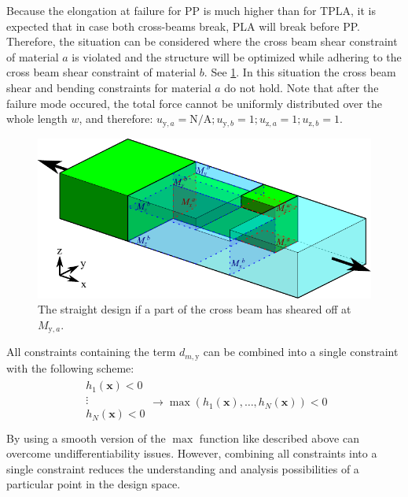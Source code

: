 Because the elongation at failure for PP is much higher than for TPLA, it is expected that in case both cross-beams break, PLA will break before PP.
Therefore, the situation can be considered where the cross beam shear constraint of material $a$ is violated and the structure will be optimized while adhering to the cross beam shear constraint of material $b$.
See \cref{fig:straight_model_broken}.
In this situation the cross beam shear and bending constraints for material $a$ do not hold.
Note that after the failure mode occured, the total force cannot be uniformly distributed over the whole length $w$, and therefore:
$
u_{\text{y},a} = \text{N/A};
u_{\text{y},b} = 1 ;
u_{\text{z},a} = 1 ;
u_{\text{z},b} = 1
$.

\begin{figure}[H]
	\centering
	\includegraphics[width=\columnwidth]{sources/method/straight_model_v3_broken.pdf}
	\caption{The straight design if a part of the cross beam has sheared off at $M_{\text{y}, a}$.}
	\label{fig:straight_model_broken}
\end{figure}

All constraints containing the term $d_{m, \text{y}}$ can be combined into a single constraint with the following scheme:
\begin{align*}
	\begin{array}{l}
		h_1(\mathbf{x}) < 0 \\
		\vdots \\
		h_N(\mathbf{x}) < 0 \\
	\end{array}
	\to
	\max \left(h_1(\mathbf{x}), \dots, h_N(\mathbf{x}) \right) < 0
\end{align*}
By using a smooth version of the $\max$ function like described above can overcome undifferentiability issues.
However, combining all constraints into a single constraint reduces the understanding and analysis possibilities of a particular point in the design space. 



